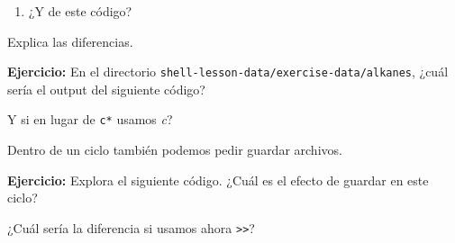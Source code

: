 \documentclass[
]{book}
\newenvironment{Shaded}{\begin{snugshade}}{\end{snugshade}}
\newcommand{\ExtensionTok}[1]{#1}
\newcommand{\NormalTok}[1]{#1}
\newcommand{\OperatorTok}[1]{\textcolor[rgb]{0.81,0.36,0.00}{\textbf{#1}}}
\newcommand{\PreprocessorTok}[1]{\textcolor[rgb]{0.56,0.35,0.01}{\textit{#1}}}
\newcommand{\VariableTok}[1]{\textcolor[rgb]{0.00,0.00,0.00}{#1}}
\providecommand{\tightlist}{%
  \setlength{\itemsep}{0pt}\setlength{\parskip}{0pt}}
\begin{document}
\begin{enumerate}
\def\labelenumi{\arabic{enumi})}
\setcounter{enumi}{1}
\tightlist
\item
  ¿Y de este código?
\end{enumerate}

\begin{Shaded}
\end{Shaded}

Explica las diferencias.

\textbf{Ejercicio:} En el directorio \texttt{shell-lesson-data/exercise-data/alkanes}, ¿cuál sería el output del siguiente código?

\begin{Shaded}
\end{Shaded}

Y si en lugar de \texttt{c*} usamos \emph{c}?

Dentro de un ciclo también podemos pedir guardar archivos.

\textbf{Ejercicio:} Explora el siguiente código. ¿Cuál es el efecto de guardar en este ciclo?

\begin{Shaded}
\end{Shaded}

¿Cuál sería la diferencia si usamos ahora \texttt{\textgreater{}\textgreater{}}?
\end{document}
